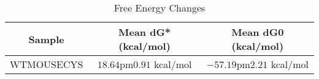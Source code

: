 \documentclass{article}
\begin{document}
\begin{table}[ht]
    \centering
    \begin{tabular}{|c|c|c|}
    \hline
    Sample & Mean dG* (kcal/mol) & Mean dG0 (kcal/mol) \\
    \hline
    WTMOUSECYS & $18.64 $pm$ 0.91$ kcal/mol & $-57.19 $pm$ 2.21$ kcal/mol \\
    \hline
    \end{tabular}
    \caption{Free Energy Changes}
\end{table}
\end{document}
